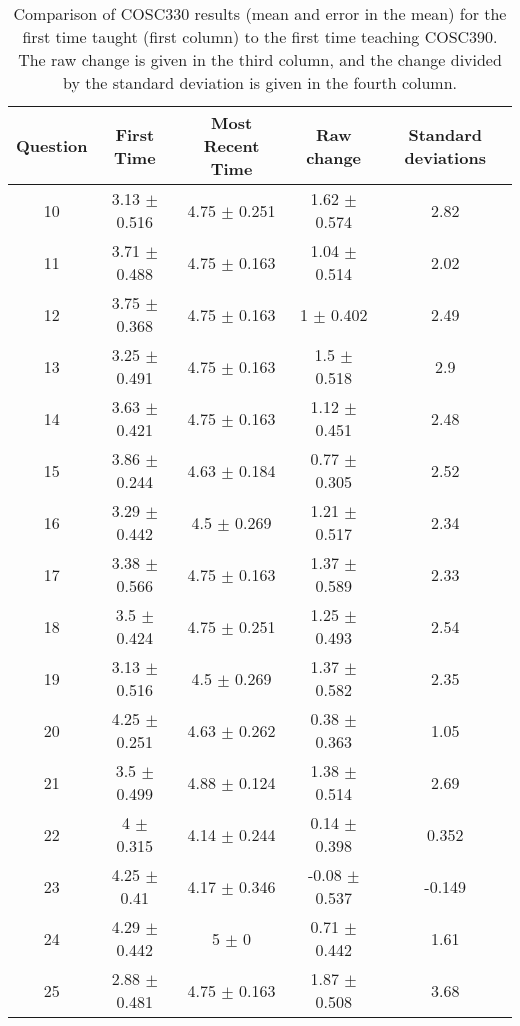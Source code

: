 \documentclass[../../main.tex]{subfiles}
\begin{document}
\begin{table}
\small
\centering
\begin{tabular}{| c | c | c | c | c |}
\hline
\hline
Question & First Time & Most Recent Time & Raw change & Standard deviations \\
\hline
10 & 3.13 $\pm$ 0.516 & 4.75 $\pm$ 0.251 & 1.62 $\pm$ 0.574 & 2.82 \\ \hline
11 & 3.71 $\pm$ 0.488 & 4.75 $\pm$ 0.163 & 1.04 $\pm$ 0.514 & 2.02 \\ \hline
12 & 3.75 $\pm$ 0.368 & 4.75 $\pm$ 0.163 & 1 $\pm$ 0.402 & 2.49 \\ \hline
13 & 3.25 $\pm$ 0.491 & 4.75 $\pm$ 0.163 & 1.5 $\pm$ 0.518 & 2.9 \\ \hline
14 & 3.63 $\pm$ 0.421 & 4.75 $\pm$ 0.163 & 1.12 $\pm$ 0.451 & 2.48 \\ \hline
15 & 3.86 $\pm$ 0.244 & 4.63 $\pm$ 0.184 & 0.77 $\pm$ 0.305 & 2.52 \\ \hline
16 & 3.29 $\pm$ 0.442 & 4.5 $\pm$ 0.269 & 1.21 $\pm$ 0.517 & 2.34 \\ \hline
17 & 3.38 $\pm$ 0.566 & 4.75 $\pm$ 0.163 & 1.37 $\pm$ 0.589 & 2.33 \\ \hline
18 & 3.5 $\pm$ 0.424 & 4.75 $\pm$ 0.251 & 1.25 $\pm$ 0.493 & 2.54 \\ \hline
19 & 3.13 $\pm$ 0.516 & 4.5 $\pm$ 0.269 & 1.37 $\pm$ 0.582 & 2.35 \\ \hline
20 & 4.25 $\pm$ 0.251 & 4.63 $\pm$ 0.262 & 0.38 $\pm$ 0.363 & 1.05 \\ \hline
21 & 3.5 $\pm$ 0.499 & 4.88 $\pm$ 0.124 & 1.38 $\pm$ 0.514 & 2.69 \\ \hline
22 & 4 $\pm$ 0.315 & 4.14 $\pm$ 0.244 & 0.14 $\pm$ 0.398 & 0.352 \\ \hline
23 & 4.25 $\pm$ 0.41 & 4.17 $\pm$ 0.346 & -0.08 $\pm$ 0.537 & -0.149 \\ \hline
24 & 4.29 $\pm$ 0.442 & 5 $\pm$ 0 & 0.71 $\pm$ 0.442 & 1.61 \\ \hline
25 & 2.88 $\pm$ 0.481 & 4.75 $\pm$ 0.163 & 1.87 $\pm$ 0.508 & 3.68 \\ \hline
\hline
\end{tabular}
\caption{\label{tab:courses:adv_shifts} Comparison of COSC330 results (mean and error in the mean) for the first time taught (first column) to the first time teaching COSC390. The raw change is given in the third column, and the change divided by the standard deviation is given in the fourth column.}
\end{table}
\end{document}
